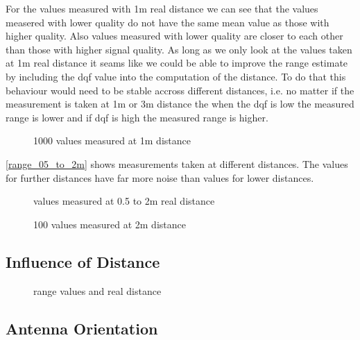 For the values measured with 1m real distance we can see that the values measered with lower quality do not have the same mean value as those with higher quality.
Also values measured with lower quality are closer to each other than those with higher signal quality.
As long as we only look at the values taken at 1m real distance it seams like we could be able to improve the range estimate by including the dqf value into the computation of the distance.
To do that this behaviour would need to be stable accross different distances, i.e. no matter if the measurement is taken at 1m or 3m distance the when the dqf is low the measured range is lower and if dqf is high the measured range is higher.
\begin{figure}[H]
	\centering
	
	\caption{1000 values measured at 1m distance}
	\label{1m_scatterplot}
\end{figure}

\autoref{range_05_to_2m} shows measurements taken at different distances.
The values for further distances have far more noise than values for lower distances. 


\begin{figure}[H]
	\centering
	
	\caption{values measured at 0.5 to 2m real distance}
	\label{range_05_to_2m}
\end{figure}

\begin{figure}[H]
	\centering
	
	\caption{100 values measured at 2m distance}
	\label{2m}
\end{figure}

\subsection{Influence of Distance}
\begin{landscape}
	\begin{figure}[H]
		\centering
		
		\caption{range values and real distance}
		\label{boxplot}
	\end{figure}
\end{landscape}

\subsection{Antenna Orientation}



